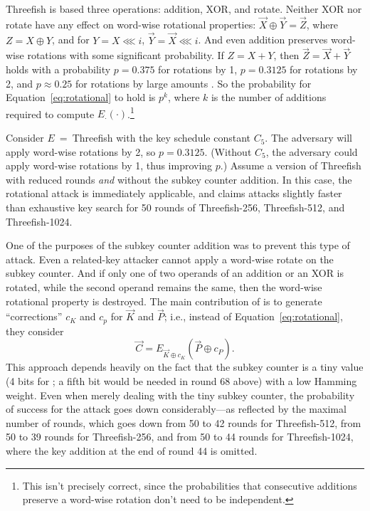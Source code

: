 \documentclass[11pt,twoside]{article}
\newcommand{\xor}{\oplus}
\newcommand{\rol}{\mathbin{\lll}}
\begin{document}
Threefish is based three operations: addition, XOR, and rotate.
Neither XOR nor rotate have any effect on word-wise rotational properties:  
$\vec{X} \xor \vec{Y} = \vec{Z}$, where $Z= X \xor Y$, and for $Y=X \rol i$, 
$\vec{Y} = \vec{X} \rol i$. And even addition preserves word-wise
rotations with some significant probability. If $Z = X + Y$, then  
$\vec{Z}=\vec{X}+\vec{Y}$ holds with a probability $p=0.375$ for rotations by
1, $p=0.3125$ for rotations by 2, and $p \approx 0.25$ for rotations by large
amounts \cite{DaumThesis}. So the probability for Equation~\ref{eq:rotational}
to hold is $p^k$, where $k$ is the number of additions required
to compute $E_{\cdot}(\cdot)$.\footnote{This isn't precisely correct, since the
  probabilities that consecutive additions preserve a word-wise rotation don't need
  to be independent.}

Consider $E$\ =\ Threefish with the key schedule constant $C_5$. The adversary
will apply word-wise rotations by 2, so $p=0.3125$. (Without $C_5$, the
adversary could apply word-wise rotations by 1, thus improving $p$.)
Assume a version of Threefish with reduced rounds \emph{and} without the
subkey counter addition. In this case, the rotational attack is immediately
applicable, and \cite{KN10} claims attacks slightly faster than exhaustive
key search for 50 rounds of Threefish-256, Threefish-512, and
Threefish-1024. 

One of the purposes of the subkey counter addition was to prevent this type of
attack. Even a related-key attacker cannot apply a word-wise
rotate on the subkey counter. And if only one of two operands of an addition
or an XOR is rotated, while the second operand remains the same, then the
word-wise rotational property is destroyed. 
The main contribution of \cite{KN10} is to generate ``corrections'' $c_K$ and 
$c_p$ for  $\vec{K}$ and $\vec{P}$; i.e., instead of
Equation~\ref{eq:rotational}, they consider 
  \[ \vec{C} = E_{\vec{K}\oplus c_K}(\vec{P} \oplus c_P). \]
This approach depends heavily on the fact that the subkey counter is a tiny
value (4 bits for \cite{KN10}; a fifth bit would be needed in round 68 above) 
with a
low Hamming weight. Even when merely dealing with the tiny subkey counter, the
probability of success for the attack goes down considerably---as reflected by the
maximal number of rounds, which goes down from 50 to 42 rounds for
Threefish-512, from 50 to 39 rounds for Threefish-256, and from 50 to 44 rounds for
Threefish-1024, where the key addition at the end of round 44 is omitted. 
\end{document}
